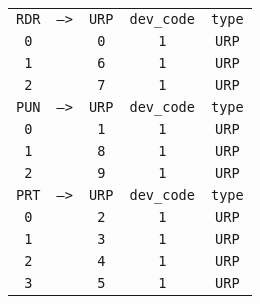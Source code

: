 \begin{adjustwidth}{5ex}{1ex}
	\begin{tabular}{ccccc}
       \texttt{RDR} & \texttt{-->} & \texttt{URP}  & \texttt{dev\_code} & \texttt{type} \\
		\texttt{0} & & \texttt{0} &  \texttt{1} & \texttt{URP} \\
		\texttt{1} & & \texttt{6} &  \texttt{1} & \texttt{URP} \\
		\texttt{2} & & \texttt{7} &  \texttt{1} & \texttt{URP} \\
        \texttt{PUN} & \texttt{-->} & \texttt{URP}  & \texttt{dev\_code} & \texttt{type} \\
		\texttt{0} & & \texttt{1} &  \texttt{1} & \texttt{URP} \\
		\texttt{1} & & \texttt{8} &  \texttt{1} & \texttt{URP} \\
		\texttt{2} & & \texttt{9} &  \texttt{1} & \texttt{URP} \\
        \texttt{PRT} & \texttt{-->} & \texttt{URP}  & \texttt{dev\_code} & \texttt{type} \\
		\texttt{0} & & \texttt{2} &  \texttt{1} & \texttt{URP} \\
		\texttt{1} & & \texttt{3} &  \texttt{1} & \texttt{URP} \\
		\texttt{2} & & \texttt{4} &  \texttt{1} & \texttt{URP} \\
		\texttt{3} & & \texttt{5} &  \texttt{1} & \texttt{URP} \\

	\end{tabular}
\end{adjustwidth}
